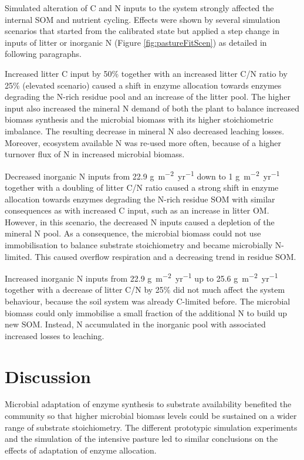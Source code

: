 Simulated alteration of C and N inputs to the system strongly affected the
internal SOM and nutrient cycling. Effects were shown by several
simulation scenarios that started from the calibrated state but applied a step change in
inputs of litter or inorganic N (Figure \ref{fig:pastureFitScen}) as detailed
in following paragraphs.

Increased litter C input by 50\% together with an increased litter C/N ratio by
25\% (elevated  scenario) caused a shift in enzyme allocation towards
enzymes degrading the N-rich residue pool and an increase of the litter pool.
The higher input also increased the mineral N demand of both the plant to
balance increased biomass synthesis and the microbial biomass with its higher
stoichiometric imbalance. The resulting decrease in mineral N also decreased
leaching losses. Moreover, ecosystem available N was re-used more often, because
of a higher turnover flux of N in increased microbial biomass.

Decreased inorganic N inputs from 22.9
\unit{g~m^{-2}yr^{-1}} down to 1
\unit{g~m^{-2}yr^{-1}} together with a doubling of litter C/N
ratio caused a strong shift in enzyme allocation towards enzymes degrading the
N-rich residue SOM with similar consequences as with increased C input,
such as an increase in litter OM. However, in this scenario, the decreased N inputs caused
a depletion of the mineral N pool.
As a consequence, the microbial biomass could not use immobilisation to
balance substrate stoichiometry and became microbially N-limited.
This caused overflow respiration and a decreasing trend in residue SOM. 

Increased inorganic N inputs from 22.9 \unit{g~m^{-2}yr^{-1}} up to 25.6
\unit{g~m^{-2}yr^{-1}} together with a decrease of litter C/N by 25\% did not
much affect the system behaviour, because the soil system was already C-limited
before. The microbial biomass could only immobilise a small fraction of
the additional N to build up new SOM. Instead, N accumulated in the inorganic
pool with associated increased losses to leaching.


\section{Discussion}
Microbial adaptation of enzyme synthesis to substrate availability benefited the
community so that higher microbial biomass levels could be sustained on a wider
range of substrate stoichiometry.
The different prototypic simulation experiments and the simulation of the
intensive pasture led to similar conclusions on the effects of adaptation of
enzyme allocation.


